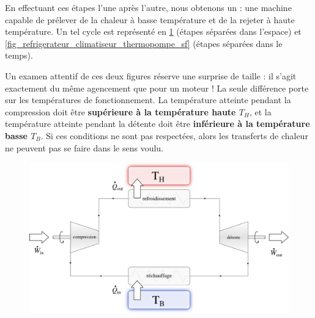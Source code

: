 			En effectuant ces étapes l’une après l’autre, nous obtenons un  : une machine capable de prélever de la chaleur à basse température et de la rejeter à haute température. Un tel cycle est représenté en \cref{fig_refrigerateur_climatiseur_thermopompe_so} (étapes séparées dans l’espace) et \ref{fig_refrigerateur_climatiseur_thermopompe_sf} (étapes séparées dans le temps).
			
			Un examen attentif de ces deux figures réserve une surprise de taille : il s’agit exactement du même agencement que pour un moteur ! La seule différence porte sur les températures de fonctionnement. La température atteinte pendant la compression doit être \textbf{supérieure à la température haute $T_H$}, et la température atteinte pendant la détente doit être \textbf{inférieure à la température basse $T_B$}. Si ces conditions ne sont pas respectées, alors les transferts de chaleur ne peuvent pas se faire dans le sens voulu.
			
			\begin{figure}
				\begin{center}
					\includegraphics[width=\textwidth]{images/refrigerateur_climatiseur_thermopompe_so.png}
				\end{center}
				\label{fig_refrigerateur_climatiseur_thermopompe_so}
			\end{figure}

